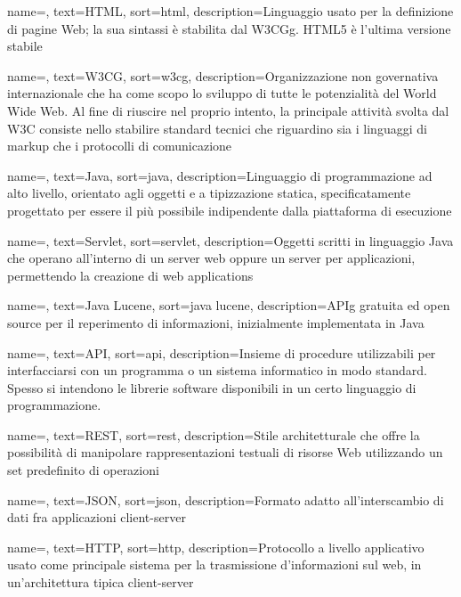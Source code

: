 {
	name=,
	text=HTML,
	sort=html,
	description={Linguaggio usato per la definizione di pagine Web; la sua sintassi è stabilita dal \gls{W3CGg}. HTML5 è l’ultima versione stabile}
}

{
	name=,
	text=W3CG,
	sort=w3cg,
	description={Organizzazione non governativa internazionale che ha come scopo lo sviluppo di tutte le potenzialità del World Wide Web. Al fine di riuscire nel proprio intento, la principale attività svolta dal W3C consiste nello stabilire standard tecnici che riguardino sia i linguaggi di markup che i protocolli di comunicazione}
}

{
	name=,
	text=Java,
	sort=java,
	description={Linguaggio di programmazione ad alto livello, orientato agli oggetti e a tipizzazione statica, specificatamente progettato per essere il più possibile indipendente dalla piattaforma di esecuzione}
}

{
	name=,
	text=Servlet,
	sort=servlet,
	description={Oggetti scritti in linguaggio \gls{Java} che operano all'interno di un server web oppure un server per applicazioni, permettendo la creazione di web applications}
}

{
	name=,
	text=Java Lucene,
	sort=java lucene,
	description={\gls{APIg} gratuita ed \gls{open source} per il reperimento di informazioni, inizialmente implementata in \gls{Java}}
}

{
	name=,
	text=API,
	sort=api,
	description={Insieme di procedure utilizzabili per interfacciarsi con un programma o un sistema informatico in modo standard. Spesso si intendono le librerie software disponibili in un certo linguaggio di programmazione.
	}
}

{
	name=,
	text=REST,
	sort=rest,
	description={Stile architetturale che offre la possibilità di manipolare rappresentazioni testuali di risorse Web utilizzando un set predefinito di operazioni}
}

{
	name=,
	text=JSON,
	sort=json,
	description={Formato adatto all'interscambio di dati fra applicazioni client-server}
}

{
	name=,
	text=HTTP,
	sort=http,
	description={Protocollo a livello applicativo usato come principale sistema per la trasmissione d'informazioni sul web, in un'architettura tipica client-server}
}

